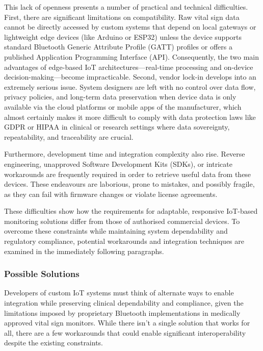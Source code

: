 This lack of openness presents a number of practical and technical difficulties. First, there are significant limitations on compatibility. Raw vital sign data cannot be directly accessed by custom systems that depend on local gateways or lightweight edge devices (like Arduino or ESP32) unless the device supports standard Bluetooth Generic Attribute Profile (GATT) profiles or offers a published Application Programming Interface (API). Consequently, the two main advantages of edge-based IoT architectures—real-time processing and on-device decision-making—become impracticable. Second, vendor lock-in develops into an extremely serious issue. System designers are left with no control over data flow, privacy policies, and long-term data preservation when device data is only available via the cloud platforms or mobile apps of the manufacturer, which almost certainly makes it more difficult to comply with data protection laws like GDPR or HIPAA in clinical or research settings where data sovereignty, repeatability, and traceability are crucial.

Furthermore, development time and integration complexity also rise. Reverse engineering, unapproved Software Development Kits (SDKs), or intricate workarounds are frequently required in order to retrieve useful data from these devices. These endeavours are laborious, prone to mistakes, and possibly fragile, as they can fail with firmware changes or violate license agreements.

These difficulties show how the requirements for adaptable, responsive IoT-based monitoring solutions differ from those of authorised commercial devices. To overcome these constraints while maintaining system dependability and regulatory compliance, potential workarounds and integration techniques are examined in the immediately following paragraphs.

\subsubsection{Possible Solutions}
Developers of custom IoT systems must think of alternate ways to enable integration while preserving clinical dependability and compliance, given the limitations imposed by proprietary Bluetooth implementations in medically approved vital sign monitors. While there isn't a single solution that works for all, there are a few workarounds that could enable significant interoperability despite the existing constraints.

